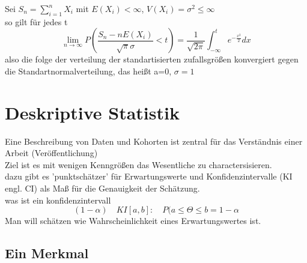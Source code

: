 \documentclass[a4paper]{article}
\theoremstyle{definition}
\newtheorem{beispiel}{Beispiel}%
\theoremstyle{remark}
\begin{document}
Sei $ S_n =\sum_{i=1}^{n}X_i$ mit $ E(X_i)< \infty$, $V(X_i)=\sigma ^2 \leq \infty$\\
so gilt für jedes t 
\begin{equation}
\lim_{n\rightarrow \infty}P\left(\frac{S_n-nE(X_i)}{\sqrt{\pi}\sigma }<t  \right)= \frac{1}{\sqrt{2\pi}}\int_{-\infty}^t e^{-\frac{x^2}{2}}dx
\end{equation}
also die folge der verteilung der standartisierten zufallsgrößen konvergiert gegen die Standartnormalverteilung, das heißt a=0, $\sigma =1$ 

\section{Deskriptive Statistik}
\label{sec:deskriptive_statistik}
Eine Beschreibung von Daten und Kohorten ist zentral für das Verständnis einer Arbeit (Veröffentlichung)\\
Ziel ist es mit wenigen Kenngrößen das Wesentliche zu charactersisieren.\\
dazu gibt es 'punktschätzer' für Erwartungswerte und Konfidenzintervalle (KI engl. CI) als Maß für die Genauigkeit der Schätzung.\\
was ist ein konfidenzintervall\:
\begin{equation}
  (1-\alpha )\quad KI[a,b]: \quad P(a\leq\Theta\leq b = 1-\alpha 
\end{equation}
Man will schätzen wie Wahrscheinlichkeit eines Erwartungswertes ist.
\subsection{Ein Merkmal}
\label{sub:ein_merkmal}
\end{document}
